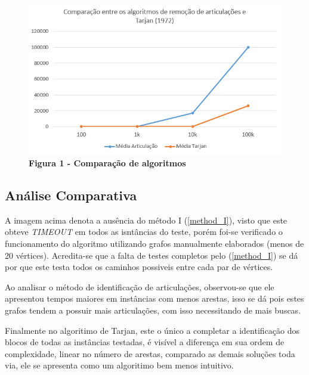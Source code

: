 \begin{figure}[ht]
	\centering	
	\includegraphics[scale=0.8]{figuras/sm_comparacao_art_tarj.png}
     \vspace{-0.2cm}
	\\\textbf{\footnotesize Figura 1 - Comparação de algoritmos}
    \label{fig:figura1}
\end{figure}
\vspace{-0.5cm}

\subsection{\esp Análise Comparativa}

A imagem acima denota a ausência do método I (\ref{method_I}), visto que este obteve \textit{TIMEOUT} em todos as isntâncias do teste, porém foi-se verificado o funcionamento do algoritmo utilizando grafos manualmente elaborados (menos de 20 vértices). Acredita-se que a falta de testes completos pelo (\ref{method_I}) se dá por que este testa todos os caminhos possiveis entre cada par de vértices. 

Ao analisar o método de identificação de articulações, observou-se que ele apresentou tempos maiores em instâncias com menos arestas, isso se dá pois estes grafos tendem a possuir mais articulações, com isso necessitando de mais buscas.

Finalmente no algoritimo de Tarjan, este o único a completar a identificação dos blocos de todas as instâncias testadas, é visível a diferença em sua ordem de complexidade, linear no número de arestas, comparado as demais soluções toda via, ele se apresenta como um algoritimo bem menos intuitivo.

